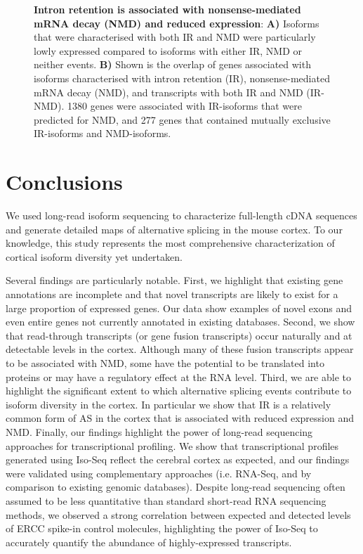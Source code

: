 \begin{figure}[!h]
\begin{center}
	\end{center}
	\captionsetup{width=0.95\textwidth}
	\caption[Association of intron retention and NMD in Whole Transcriptome Iso-Seq]%
	{\textbf{Intron retention is associated with nonsense-mediated mRNA decay (NMD) and reduced expression}: \textbf{A)} Isoforms that were characterised with both IR and NMD were particularly lowly expressed compared to isoforms with either IR, NMD or neither events. \textbf{B)} Shown is the overlap of genes associated with isoforms characterised with intron retention (IR), nonsense-mediated mRNA decay (NMD), and transcripts with both IR and NMD (IR-NMD). 1380 genes were associated with IR-isoforms that were predicted for NMD, and 277 genes that contained mutually exclusive IR-isoforms and NMD-isoforms. }
	\label{fig:isoseq_whole_IRNMD}
\end{figure}


\newpage
\section{Conclusions}
We used long-read isoform sequencing to characterize full-length cDNA sequences and generate detailed maps of alternative splicing in the mouse cortex. To our knowledge, this study represents the most comprehensive characterization of cortical isoform diversity yet undertaken. 

Several findings are particularly notable. First, we highlight that existing gene annotations are incomplete and that novel transcripts are likely to exist for a large proportion of expressed genes. Our data show examples of novel exons and even entire genes not currently annotated in existing databases. Second, we show that read-through transcripts (or gene fusion transcripts) occur naturally\cite{Mehani2020} and at detectable levels in the cortex. Although many of these fusion transcripts appear to be associated with NMD, some have the potential to be translated into proteins or may have a regulatory effect at the RNA level. Third, we are able to highlight the significant extent to which alternative splicing events contribute to isoform diversity in the cortex. In particular we show that IR is a relatively common form of AS in the cortex that is associated with reduced expression and NMD. Finally, our findings highlight the power of long-read sequencing approaches for transcriptional profiling. We show that transcriptional profiles generated using Iso-Seq reflect the cerebral cortex as expected, and our findings were validated using complementary approaches (i.e. RNA-Seq, and by comparison to existing genomic databases). Despite long-read sequencing often assumed to be less quantitative than standard short-read RNA sequencing methods\cite{Zhao2019}, we observed a strong correlation between expected and detected levels of ERCC spike-in control molecules, highlighting the power of Iso-Seq to accurately quantify the abundance of highly-expressed transcripts.

